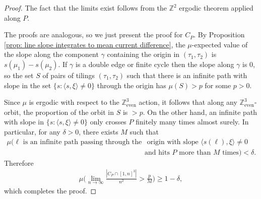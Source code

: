 \documentclass[11pt]{article}
\theoremstyle{remark}
\theoremstyle{definition}
\newcommand{\Z}{\mathbb{Z}}
\newcommand{\threeeven}{\Z^3_{\text{even}}}
\newcommand{\m}[1]{\mathbb{#1}}
\begin{document}
\begin{proof}
    The fact that the limits exist follows from the $\m Z^2$ ergodic theorem applied along $P$. 
    
    The proofs are analogous, so we just present the proof for $C_P$. By Proposition \ref{prop: line slope integrates to mean current difference}, the $\mu$-expected value of the slope along the component $\gamma$ containing the origin in $(\tau_1,\tau_2)$ is $s(\mu_1) - s(\mu_2)$. If $\gamma$ is a double edge or finite cycle then the slope along $\gamma$ is $0$, so the set $S$ of pairs of tilings $(\tau_1,\tau_2)$ such that there is an infinite path with slope in the set $\{ s : \langle s, \xi\rangle \neq 0\}$ through the origin has $\mu(S) > p$ for some $p>0$. 
    
    Since $\mu$ is ergodic with respect to the $\threeeven$ action, it follows that along any $\threeeven$-orbit, the proportion of the orbit in $S$ is $>p$. %
    On the other hand, an infinite path with slope in $\{s :\langle s, \xi \rangle \neq 0\}$ only crosses $P$ finitely many times almost surely. In particular, for any $\delta>0$, there exists $M$ such that
    \begin{align*}
        \mu ( \ell \text{ is an infinite path passing through the}&\text{ origin with slope $\langle s(\ell), \xi\rangle \neq 0$} \\
         &\text{and hits $P$ more than $M$ times} ) < \delta.
    \end{align*}
    Therefore
    \begin{align*}
        \mu\bigg( \lim_{n\to \infty} \frac{|C_P\cap [1,n]^3|}{n^2} > \frac{p}{M} \bigg) \geq 1-\delta,
    \end{align*}
    which completes the proof. 
\end{proof}
\end{document}
